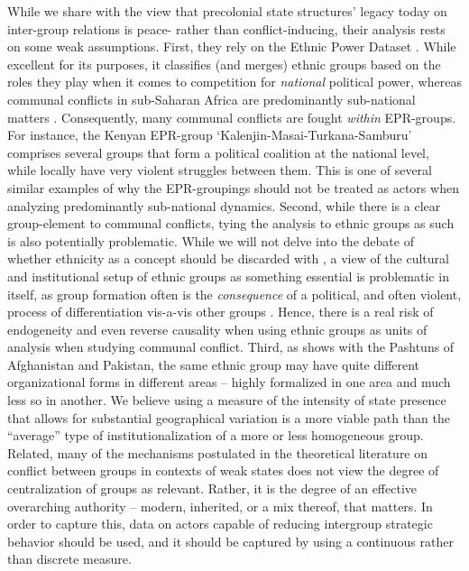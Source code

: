 While we share with \citet{Wig2018} the view that precolonial state structures'
legacy today on inter-group relations is peace- rather than conflict-inducing,
their analysis rests on some weak assumptions. First, they rely on the Ethnic
Power Dataset \citep{Cederman2010}. While excellent for its purposes, it
classifies (and merges) ethnic groups based on the roles they play when it comes
to competition for \textit{national} political power, whereas communal conflicts
in sub-Saharan Africa are predominantly sub-national matters
\citep{Hillesund_2017}. Consequently, many communal conflicts are fought
\textit{within} EPR-groups. For instance, the Kenyan EPR-group
`Kalenjin-Masai-Turkana-Samburu' comprises several groups that form a
political coalition at the national level, while locally have very violent struggles
between them. This is one of several similar examples of why the EPR-groupings
should not be treated as actors when analyzing predominantly sub-national
dynamics. Second, while there is a clear group-element to communal conflicts,
tying the analysis to ethnic groups as such is also potentially problematic.
While we will not delve into the debate of whether ethnicity as a concept should
be discarded with \citep{Chandra2006}, a view of the cultural and institutional
setup of ethnic groups as something essential is problematic in itself, as group
formation often is the \textit{consequence} of a political, and often violent,
process of differentiation vis-a-vis other groups \citep[15]{barth1969,
GraeberDavid2021TDoE}.  Hence, there is a real risk of endogeneity and even
reverse causality when using ethnic groups as units of analysis when studying
communal conflict. Third, as \citet[12f]{barth1969} shows with the Pashtuns of
Afghanistan and Pakistan, the same ethnic group may have quite different
organizational forms in different areas -- highly formalized in one area and
much less so in another. We believe using a measure of the intensity of state
presence that allows for substantial geographical variation is a more viable
path than the ``average'' type of institutionalization of a more or less
homogeneous group. Related, many of the mechanisms postulated in the theoretical
literature on conflict between groups in contexts of weak states does not view
the degree of centralization of groups as relevant. Rather, it is the degree of
an effective overarching authority -- modern, inherited, or a mix thereof, that
matters.  In order to capture this, data on actors capable of reducing
intergroup strategic behavior should be used, and it should be captured by using
a continuous rather than discrete measure.

